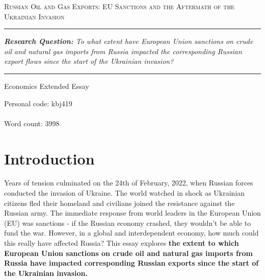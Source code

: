 \documentclass[12pt]{article}
\begin{document}
 

\thispagestyle{empty}

 \begin{center}
            \large{
                \textsc{
                    Russian Oil and Gas Exports:  EU Sanctions and the Aftermath of the Ukrainian Invasion
                    }
            }
      
      \vspace{2cm}
      
      \rule[6pt]{450pt}{0.5pt}
      
      \large{
        \textit{
            \textbf{Research Question:} 
            To what extent have European Union sanctions on crude oil and natural gas imports from Russia impacted the corresponding Russian export flows since the start of the Ukrainian invasion?
            }
        }
      
      \rule[6pt]{450pt}{0.5pt}
      
      \vspace{1cm}
      
      Economics Extended Essay
      
      \vspace{10cm}
      
      Personal code: kbj419 \\ \\
      Word count: 3998
 \end{center}
 
 
 \pagebreak
  
 \tableofcontents 
 
 \pagebreak
 
 \section{Introduction}

 
 Years of tension culminated on the 24th of February, 2022, when Russian forces conducted the invasion of Ukraine. The world watched in shock as Ukrainian citizens fled their homeland and civilians joined the resistance against the Russian army. The immediate response from world leaders in the European Union (EU) was sanctions - if the Russian economy crashed, they wouldn't be able to fund the war. However, in a global and interdependent economy, how much could this really have affected Russia? This essay explores \textbf{the extent to which European Union sanctions on crude oil and natural gas imports from Russia have impacted corresponding Russian exports since the start of the Ukrainian invasion.}
 
\end{document}
